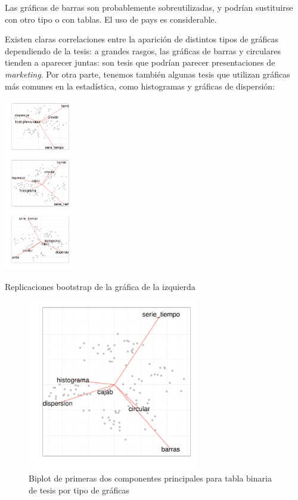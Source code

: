 \documentclass{tufte-handout}\usepackage{graphicx, color}
\begin{document}

\vspace{1cm}
Las gráficas de barras son probablemente sobreutilizadas, y podrían sustituirse
con otro tipo o con tablas. El uso de pays es considerable.


Existen claras correlaciones entre la aparición de distintos tipos
de gráficas dependiendo de la tesis: a grandes rasgos, las gráficas de
barras y circulares tienden a aparecer juntas: son tesis que podrían parecer
presentaciones de {\em marketing}. Por otra parte, tenemos también algunas tesis
que utilizan gráficas más comunes en la estadística, como histogramas
y gráficas de dispersión:

\begin{marginfigure}[14cm]
  \includegraphics[width=3cm]{./figure/graf3.pdf}
  \caption{Replicaciones bootstrap de la gráfica de la izquierda}
\end{marginfigure}



\begin{figure}[!h]
\centering
\caption{Biplot de primeras dos componentes principales para tabla binaria de tesis por tipo de gráficas}
\includegraphics[width=7.5cm]{./figure/graf2.pdf}
\end{figure}
\end{document}
